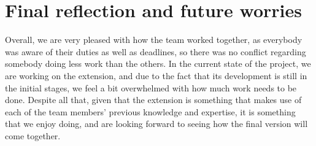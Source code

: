 \documentclass{article}
\begin{document}
\section{Final reflection and future worries}
Overall, we are very pleased with how the team worked together, as everybody was aware of their duties as well as deadlines, so there was no conflict regarding somebody doing less work than the others.
In the current state of the project, we are working on the extension, and due to the fact that its development is still in the initial stages, we feel a bit overwhelmed with how much work needs to be done. Despite all that, given that the extension is something that makes use of each of the team members' previous knowledge and expertise, it is something that we enjoy doing, and are looking forward to seeing how the final version will come together.
\end{document}
